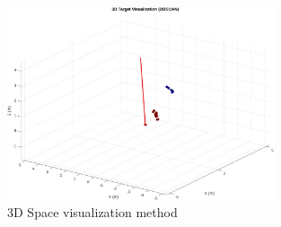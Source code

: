 \begin{figure}[h!]
	\centering
	\includegraphics[width=0.7\textwidth]{../img/vis_3d.jpg}
	\caption[3D Space visualization method]{3D Space visualization method}
	\label{fig:vis3d}
\end{figure}






\listoffigures

\listoftables

\clearpage
\openright

